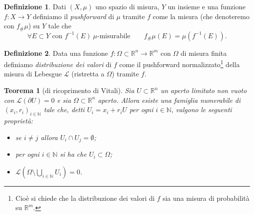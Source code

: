 \documentclass[a4paper,11pt]{book}
\theoremstyle{plain}
\newtheorem{teo}{Teorema}[chapter]
\theoremstyle{definition}
\newtheorem{defn}{Definizione}[chapter]
\theoremstyle{remark}
\newcommand{\R}{\mathbb{R}}
\newcommand{\N}{\mathbb{N}}
\newcommand{\LL}{\mathscr{L}}
\begin{document}
\begin{defn}
	Dati $(X,\mu)$ uno spazio di misura, $Y$ un insieme e una funzione $f:X\to Y$ definiamo il \textit{pushforward} di $\mu$ tramite $f$ come la misura (che denoteremo con $f_{\#}\mu$) su $Y$ tale che
	\[
		\forall E\subset Y\text{ con }f^{-1}(E)\ \mu\text{-misurabile}\qquad f_{\#}\mu(E) = \mu(f^{-1}(E)).
	\]
\end{defn}
\begin{defn}\label{defn:2}
	Data una funzione $f:\Omega\subset\R^{n}\to \R^{m}$ con $\Omega$ di misura finita definiamo \textit{distribuzione dei valori} di $f$ come il pushforward normalizzato\footnote{Cioè si chiede che la distribuzione dei valori di $f$ sia una misura di probabilità su $\R^{m}$.} della misura di Lebesgue $\LL$ (ristretta a $\Omega$) tramite $f$.
\end{defn}
\begin{teo}[di ricoprimento di Vitali]\label{teo:11}
	Sia $U\subset\R^{n}$ un aperto limitato non vuoto con $\LL(\partial U)=0$ e sia $\Omega\subset\R^{n}$ aperto. Allora esiste una famiglia numerabile di $(x_{i},r_{i})_{i\in\N}$ tale che, detti $U_{i}=x_{i}+r_{i}U$ per ogni $i\in\N$, valgono le seguenti proprietà:
	\begin{itemize}
		\item se $i\neq j$ allora $U_{i}\cap U_{j}=\emptyset$;{}
		\item per ogni $i\in\N$ si ha che $U_{i}\subset \Omega$;{}
		\item $\LL(\Omega\setminus\bigcup_{i\in\N}U_{i})=0$.
	\end{itemize}
\end{teo}
\end{document}
